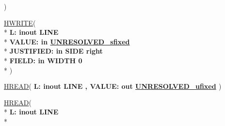 \begin{DoxyCompactItemize}
   )
\item 
{\bfseries {\bfseries \textcolor{vhdlchar}{ }}} \hyperlink{classfixed__pkg_a7489e4baa76d9f6ad80e726bc05cde6f}{H\+W\+R\+I\+T\+E}( \\*
{\bfseries \textcolor{vhdlchar}{ }\textcolor{vhdlchar}{L\+: }\textcolor{stringliteral}{} {\bfseries \textcolor{keywordflow}{inout}\textcolor{vhdlchar}{ }\textcolor{vhdlchar}{L\+I\+N\+E}\textcolor{vhdlchar}{ }}}\\*
  {\bfseries \textcolor{vhdlchar}{ }\textcolor{vhdlchar}{V\+A\+L\+U\+E\+: }\textcolor{stringliteral}{} {\bfseries \textcolor{keywordflow}{in}\textcolor{vhdlchar}{ }{\bfseries \hyperlink{classfixed__pkg_aa723b28a027c3c0f9bca02d75e8df4d6}{U\+N\+R\+E\+S\+O\+L\+V\+E\+D\+\_\+sfixed}} \textcolor{vhdlchar}{ }}}\\*
  {\bfseries \textcolor{vhdlchar}{ }\textcolor{vhdlchar}{J\+U\+S\+T\+I\+F\+I\+E\+D\+: }\textcolor{stringliteral}{} {\bfseries \textcolor{keywordflow}{in}\textcolor{vhdlchar}{ }\textcolor{vhdlchar}{S\+I\+D\+E}\textcolor{vhdlchar}{ }\textcolor{vhdlchar}{ }\textcolor{vhdlchar}{ }\textcolor{vhdlchar}{ }\textcolor{vhdlchar}{ }\textcolor{vhdlkeyword}{right}\textcolor{vhdlchar}{ }}}\\*
  {\bfseries \textcolor{vhdlchar}{ }\textcolor{vhdlchar}{F\+I\+E\+L\+D\+: }\textcolor{stringliteral}{} {\bfseries \textcolor{keywordflow}{in}\textcolor{vhdlchar}{ }\textcolor{vhdlchar}{W\+I\+D\+T\+H}\textcolor{vhdlchar}{ }\textcolor{vhdlchar}{ }\textcolor{vhdlchar}{ } \textcolor{vhdldigit}{0} \textcolor{vhdlchar}{ }}}\\*
   )
\item 
{\bfseries {\bfseries \textcolor{vhdlchar}{ }}} \hyperlink{classfixed__pkg_a32e9f65860805423413af60fab3bddee}{H\+R\+E\+A\+D}( {\bfseries \textcolor{vhdlchar}{ }\textcolor{vhdlchar}{L\+: }\textcolor{stringliteral}{} {\bfseries \textcolor{keywordflow}{inout}\textcolor{vhdlchar}{ }\textcolor{vhdlchar}{L\+I\+N\+E}\textcolor{vhdlchar}{ }}}{\bfseries ,\textcolor{vhdlchar}{ }\textcolor{vhdlchar}{V\+A\+L\+U\+E\+: }\textcolor{stringliteral}{} {\bfseries \textcolor{keywordflow}{out}\textcolor{vhdlchar}{ }{\bfseries \hyperlink{classfixed__pkg_ae78bc2b36d22f6abeac163955e8a587d}{U\+N\+R\+E\+S\+O\+L\+V\+E\+D\+\_\+ufixed}} \textcolor{vhdlchar}{ }}} )
\item 
{\bfseries {\bfseries \textcolor{vhdlchar}{ }}} \hyperlink{classfixed__pkg_abd2fa8e7226ac69f2ec1646ed64652af}{H\+R\+E\+A\+D}( \\*
{\bfseries \textcolor{vhdlchar}{ }\textcolor{vhdlchar}{L\+: }\textcolor{stringliteral}{} {\bfseries \textcolor{keywordflow}{inout}\textcolor{vhdlchar}{ }\textcolor{vhdlchar}{L\+I\+N\+E}\textcolor{vhdlchar}{ }}}\\*

\end{DoxyCompactItemize}
